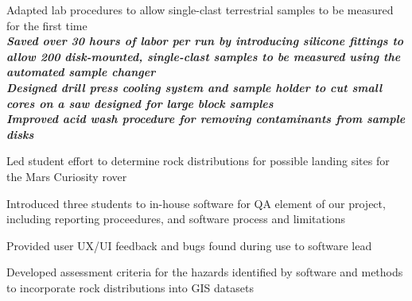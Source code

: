 \documentclass[letterpaper]{deedy-resume} %
\begin{document}
\begin{minipage}[t]{0.66\textwidth}
\sectionspace %



\begin{tightitemize}
\item Adapted lab procedures to allow single-clast terrestrial samples to be measured for the first time \\
{\footnotesize \textit{\textbf{Saved over 30 hours of labor per run by introducing silicone fittings to allow 200 disk-mounted, single-clast samples to be measured using the automated sample changer }}} \\
{\footnotesize \textit{\textbf{Designed drill press cooling system and sample holder to cut small cores on a saw designed for large block samples }}} \\
{\footnotesize \textit{\textbf{Improved acid wash procedure for removing contaminants from sample disks }}} \\
\end{tightitemize}

\sectionspace %



\begin{tightitemize}
\item Led student effort to determine rock distributions for possible landing sites for the Mars Curiosity rover \\
\item Introduced three students to in-house software for QA element of our project, including reporting proceedures, and software process and limitations \\
\item Provided user UX/UI feedback and bugs found during use to software lead \\
\item Developed assessment criteria for the hazards identified by software and methods to incorporate rock distributions into GIS datasets \\
\end{tightitemize}


\end{minipage}
\end{document}
